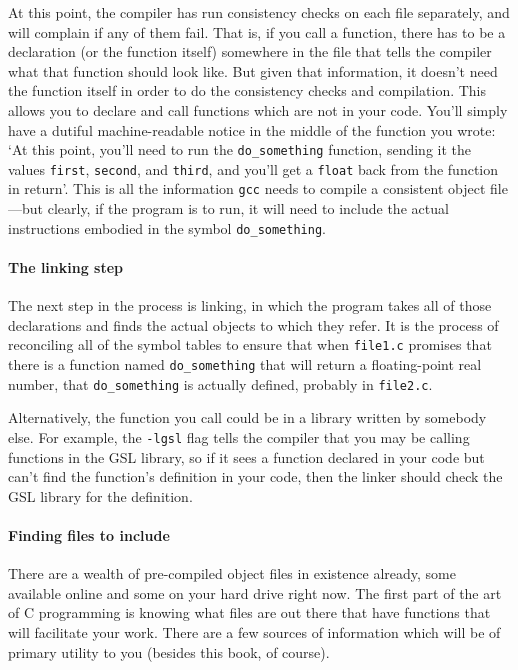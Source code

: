 \documentclass[12pt]{article}
\def\ind#1{\index{#1}#1}
\begin{document}
At this point, the compiler has run consistency checks on each file separately,
and will complain if any of them fail. That is, if you call a function,
there has to be a declaration (or the function itself) somewhere in the
file that tells the compiler what that function should look like. But 
given that information, it doesn't need the function itself in order to
do the consistency checks and compilation. This allows you to declare
and call functions which are not in your code. You'll simply have a
dutiful machine-readable notice in the middle of the function you wrote:
`At this point, you'll need to run the {\tt do\_something} function,
sending it the values {\tt first}, {\tt second}, and {\tt third}, and
you'll get a {\tt float} back from the function in return'. This is
all the information {\tt gcc} needs to compile a consistent object file---but
clearly, if the program is to run, it will need to include the actual
instructions embodied in the symbol {\tt do\_something}.

\paragraph{The \ind{linking} step}
The next step in the process is linking, in which the program takes all
of those declarations and finds the actual objects to which they refer. It
is the process of reconciling all of the symbol tables to ensure that when
{\tt file1.c} promises that there is a function named {\tt do\_something}
that will return a floating-point real number, that {\tt do\_something}
is actually defined,  probably in {\tt file2.c}.

Alternatively, the function you call could be in a library written by
somebody else.  For example, the {\tt -lgsl} flag tells the compiler that
you may be calling functions in the GSL library, so if it sees a function
declared in your code but can't find the function's definition in your
code, then the linker should check the GSL library for the definition.


\paragraph{Finding files to include}
There are a wealth of pre-compiled object files in existence already,
some available online and some on your hard drive right now.  The first
part of the art of C programming is knowing what files are out there that have
functions that will facilitate your work. There
are a few sources of information which will be of primary utility to you
(besides this book, of course).
\end{document}
